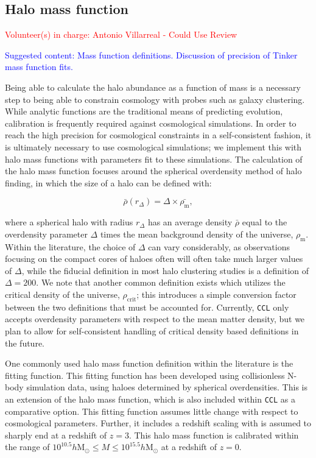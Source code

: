 \documentclass[\docopts]{\docclass}
\newcommand{\vol}[1]{\textcolor{red}{Volunteer(s) in charge: #1}}
\newcommand{\cont}[1]{\textcolor{blue}{Suggested content: #1}}
\newcommand{\ccl}{{\tt CCL}\xspace}
\begin{document}
\subsection{Halo mass function}
\vol{Antonio Villarreal - Could Use Review}

\cont{Mass function definitions. Discussion of precision of Tinker mass function fits.}

Being able to calculate the halo abundance as a function of mass is a necessary step to being able to constrain cosmology with probes such as galaxy clustering. While analytic functions are the traditional means of predicting evolution, calibration is frequently required against cosmological simulations. In order to reach the high precision for cosmological constraints in a self-consistent fashion, it is ultimately necessary to use cosmological simulations; we implement this with halo mass functions with parameters fit to these simulations. The calculation of the halo mass function focuses around the spherical overdensity method of halo finding, in which the size of a halo can be defined with:

\begin{equation}
\bar{\rho}(r_{\Delta}) = \Delta \times \bar{\rho_{\mathrm{m}}},
\end{equation}

where a spherical halo with radius $r_{\Delta}$ has an average density $\bar{\rho}$ equal to the overdensity parameter $\Delta$ times the mean background density of the universe, $\rho_{\mathrm{m}}$. Within the literature, the choice of $\Delta$ can vary considerably, as observations focusing on the compact cores of haloes often will often take much larger values of $\Delta$, while the fiducial definition in most halo clustering studies is a definition of $\Delta = 200$. We note that another common definition exists which utilizes the critical density of the universe, $\rho_{\mathrm{crit}}$; this introduces a simple conversion factor between the two definitions that must be accounted for. Currently, \ccl only accepts overdensity parameters with respect to the mean matter density, but we plan to allow for self-consistent handling of critical density based definitions in the future.

One commonly used halo mass function definition within the literature is the \citet{Tinker2010} fitting function. This fitting function has been developed using collisionless N-body simulation data, using haloes determined by spherical overdensities. This is an extension of the \citet{Tinker2008} halo mass function, which is also included within \ccl as a comparative option. This fitting function assumes little change with respect to cosmological parameters. Further, it includes a redshift scaling with is assumed to sharply end at a redshift of $z = 3$. This halo mass function is calibrated within the range of $10^{10.5} h\mathrm{M}_\odot \leq M \leq 10^{15.5} h\mathrm{M}_\odot$ at a redshift of $z = 0$.
\end{document}
